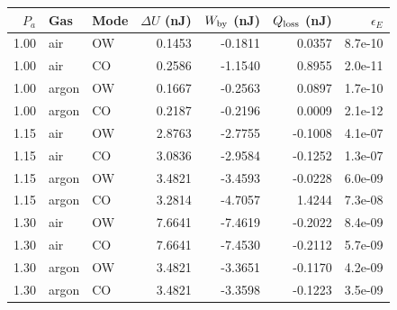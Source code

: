 \begin{tabular}{rllrrrr}\toprule
$P_a$ & Gas & Mode & $\Delta U$ (nJ) & $W_{\rm by}$ (nJ) & $Q_{\rm loss}$ (nJ) & $\epsilon_E$ \\
\midrule
1.00 & air & OW & 0.1453 & -0.1811 & 0.0357 & 8.7e-10 \\
1.00 & air & CO & 0.2586 & -1.1540 & 0.8955 & 2.0e-11 \\
1.00 & argon & OW & 0.1667 & -0.2563 & 0.0897 & 1.7e-10 \\
1.00 & argon & CO & 0.2187 & -0.2196 & 0.0009 & 2.1e-12 \\
1.15 & air & OW & 2.8763 & -2.7755 & -0.1008 & 4.1e-07 \\
1.15 & air & CO & 3.0836 & -2.9584 & -0.1252 & 1.3e-07 \\
1.15 & argon & OW & 3.4821 & -3.4593 & -0.0228 & 6.0e-09 \\
1.15 & argon & CO & 3.2814 & -4.7057 & 1.4244 & 7.3e-08 \\
1.30 & air & OW & 7.6641 & -7.4619 & -0.2022 & 8.4e-09 \\
1.30 & air & CO & 7.6641 & -7.4530 & -0.2112 & 5.7e-09 \\
1.30 & argon & OW & 3.4821 & -3.3651 & -0.1170 & 4.2e-09 \\
1.30 & argon & CO & 3.4821 & -3.3598 & -0.1223 & 3.5e-09 \\
\bottomrule\end{tabular}
